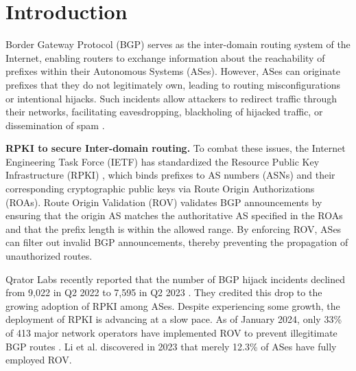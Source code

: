 \section{Introduction} \label{sec:lov_overview}
Border Gateway Protocol (BGP) \cite{rfc4271} serves as the inter-domain routing system of the Internet, enabling routers to exchange information about the reachability of prefixes within their Autonomous Systems (ASes). However, ASes can originate prefixes that they do not legitimately own, leading to routing misconfigurations or intentional hijacks. Such incidents allow attackers to redirect traffic through their networks, facilitating eavesdropping, blackholing of hijacked traffic, or dissemination of spam \cite{ballani2007study,vervier2015mind,vervier2013spamtracer}.

\textbf{RPKI to secure Inter-domain routing.}
To combat these issues, the Internet Engineering Task Force (IETF) has standardized the Resource Public Key Infrastructure (RPKI) \cite{RPKI}, which binds prefixes to AS numbers (ASNs) and their corresponding cryptographic public keys via Route Origin Authorizations (ROAs).
Route Origin Validation (ROV) \cite{huston2012validation} validates BGP announcements by ensuring that the origin AS matches the authoritative AS specified in the ROAs and that the prefix length is within the allowed range.
By enforcing ROV, ASes can filter out invalid BGP announcements, thereby preventing the propagation of unauthorized routes.

Qrator Labs recently reported that the number of BGP hijack incidents declined from 9,022 in Q2 2022 to 7,595 in Q2 2023 \cite{Qrator}. They credited this drop to the growing adoption of RPKI among ASes.
Despite experiencing some growth, the deployment of RPKI is advancing at a slow pace.
As of January 2024, only 33\% of 413 major network operators have implemented ROV to prevent illegitimate BGP routes \cite{cloudflare}. Li et al. \cite{li2023rovista} discovered in 2023 that merely 12.3\% of ASes have fully employed ROV.

